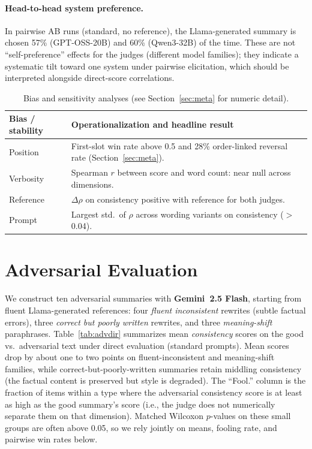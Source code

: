 \documentclass[11pt]{article}
\begin{document}
\paragraph{Head-to-head system preference.}
In pairwise AB runs (standard, no reference), the Llama-generated summary is chosen 57\% (GPT-OSS-20B) and 60\% (Qwen3-32B) of the time. These are not ``self-preference'' effects for the judges (different model families); they indicate a systematic tilt toward one system under pairwise elicitation, which should be interpreted alongside direct-score correlations.

\begin{table}[t]
\centering
\footnotesize
\begin{tabularx}{\columnwidth}{@{}>{\raggedright\arraybackslash}p{} X@{}}
\toprule
Bias / stability & Operationalization and headline result \\
\midrule
Position & First-slot win rate above 0.5 and 28\% order-linked reversal rate (Section~\ref{sec:meta}). \\
Verbosity & Spearman $r$ between score and word count: near null across dimensions. \\
Reference & $\Delta\rho$ on consistency positive with reference for both judges. \\
Prompt & Largest std.\ of $\rho$ across wording variants on consistency ($>$0.04). \\
\bottomrule
\end{tabularx}
\caption{Bias and sensitivity analyses (see Section~\ref{sec:meta} for numeric detail).}
\label{tab:bias}
\end{table}

\section{Adversarial Evaluation}
\label{sec:adversarial}

We construct ten adversarial summaries with \textbf{Gemini~2.5 Flash}, starting from fluent Llama-generated references: four \emph{fluent inconsistent} rewrites (subtle factual errors), three \emph{correct but poorly written} rewrites, and three \emph{meaning-shift} paraphrases. Table~\ref{tab:advdir} summarizes mean \emph{consistency} scores on the good vs.\ adversarial text under direct evaluation (standard prompts). Mean scores drop by about one to two points on fluent-inconsistent and meaning-shift families, while correct-but-poorly-written summaries retain middling consistency (the factual content is preserved but style is degraded). The ``Fool.'' column is the fraction of items within a type where the adversarial consistency score is at least as high as the good summary's score (i.e., the judge does not numerically separate them on that dimension). Matched Wilcoxon $p$-values on these small groups are often above 0.05, so we rely jointly on means, fooling rate, and pairwise win rates below.
\end{document}
